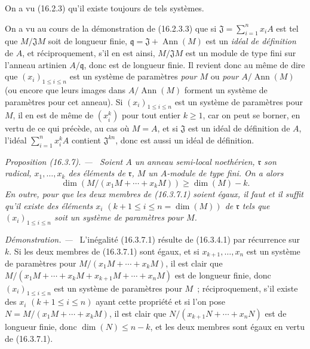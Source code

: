 \documentclass[10pt,oneside]{book}
\makeatletter
\newcommand{\setmanualcurrentlabel}[1]{\def\@currentlabel{#1}}
\newenvironment{proposition}[1][]{%
  \setmanualcurrentlabel{#1}\par\medskip\noindent\itshape Proposition (#1). ---\ }{\par}
\newenvironment{proof}{%
  \par\medskip\noindent\textit{Démonstration. ---\ }}{\par}
\makeatother
\begin{document}
On a vu (16.2.3) qu'il existe toujours de tels systèmes.

On a vu au cours de la démonstration de (16.2.3.3) que si
$\mathfrak{J}=\sum_{i=1}^n x_iA$ est tel que $M/\mathfrak{J}M$ soit de
longueur finie, $\mathfrak{q}=\mathfrak{J}+\operatorname{Ann}(M)$ est un
\emph{idéal de définition} de $A$, et réciproquement, s'il en est ainsi,
$M/\mathfrak{J}M$ est un module de type fini sur l'anneau artinien
$A/\mathfrak{q}$, donc est de longueur finie. Il revient donc au même de dire
que $(x_i)_{1\leq i\leq n}$ est un système de paramètres \emph{pour $M$} ou
\emph{pour $A/\operatorname{Ann}(M)$} (ou encore que leurs images dans
$A/\operatorname{Ann}(M)$ forment un système de paramètres pour cet anneau).
Si $(x_i)_{1\leq i\leq n}$ est un système de paramètres pour $M$, il en est de
même de $(x_i^k)$ pour tout entier $k\geq1$, car on peut se borner, en vertu de
ce qui précède, au cas où $M=A$, et si $\mathfrak{J}$ est un idéal de
définition de $A$, l'idéal $\sum_{i=1}^n x_i^kA$ contient
$\mathfrak{J}^{kn}$, donc est aussi un idéal de définition.

\begin{proposition}[16.3.7]
\label{0.16.3.7-fr}
Soient $A$ un anneau semi-local noethérien, $\mathfrak{r}$ son radical,
$x_1,\ldots,x_k$ des éléments de $\mathfrak{r}$, $M$ un $A$-module de type
fini. On a alors
\begin{equation}
\label{0.16.3.7.1-fr}
\tag{16.3.7.1}
  \dim(M/(x_1M+\cdots+x_kM))\geq\dim(M)-k.
\end{equation}
En outre, pour que les deux membres de (16.3.7.1) soient égaux, il faut et il
suffit qu'il existe des éléments $x_i$
$(k+1\leq i\leq n=\dim(M))$ de $\mathfrak{r}$ tels que
$(x_i)_{1\leq i\leq n}$ soit un système de paramètres pour $M$.
\end{proposition}

\begin{proof}
L'inégalité (16.3.7.1) résulte de (16.3.4.1) par récurrence sur $k$. Si les
deux membres de (16.3.7.1) sont égaux, et si $x_{k+1},\ldots,x_n$ est un
système de paramètres pour $M/(x_1M+\cdots+x_kM)$, il est clair que
$M/(x_1M+\cdots+x_kM+x_{k+1}M+\cdots+x_nM)$ est de longueur finie, donc
$(x_i)_{1\leq i\leq n}$ est un système de paramètres pour $M$~;
réciproquement, s'il existe des $x_i$ $(k+1\leq i\leq n)$ ayant cette
propriété et si l'on pose $N=M/(x_1M+\cdots+x_kM)$, il est clair que
$N/(x_{k+1}N+\cdots+x_nN)$ est de longueur finie, donc
$\dim(N)\leq n-k$, et les deux membres sont égaux en vertu de (16.3.7.1).
\end{proof}
\end{document}
